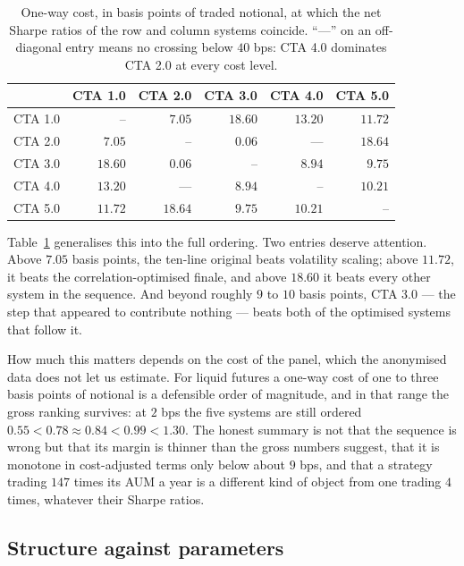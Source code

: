 \documentclass[11pt,a4paper]{article}
\begin{document}
\begin{table}[t]
\centering
\caption{One-way cost, in basis points of traded notional, at which the net
Sharpe ratios of the row and column systems coincide. ``---'' on an
off-diagonal entry means no crossing below $40$ bps: CTA 4.0 dominates
CTA 2.0 at every cost level.}
\label{tab:breakeven}
\begin{tabular}{lrrrrr}
\toprule
& CTA 1.0 & CTA 2.0 & CTA 3.0 & CTA 4.0 & CTA 5.0 \\
\midrule
CTA 1.0 & --      & $7.05$   & $18.60$ & $13.20$ & $11.72$ \\
CTA 2.0 & $7.05$  & --       & $0.06$  & ---     & $18.64$ \\
CTA 3.0 & $18.60$ & $0.06$   & --      & $8.94$  & $9.75$  \\
CTA 4.0 & $13.20$ & ---      & $8.94$  & --      & $10.21$ \\
CTA 5.0 & $11.72$ & $18.64$  & $9.75$  & $10.21$ & --      \\
\bottomrule
\end{tabular}
\end{table}

Table~\ref{tab:breakeven} generalises this into the full ordering. Two entries
deserve attention. Above $7.05$ basis points, the ten-line original beats
volatility scaling; above $11.72$, it beats the correlation-optimised finale,
and above $18.60$ it beats every other system in the sequence. And beyond
roughly $9$ to $10$ basis points, CTA 3.0 --- the step that appeared to
contribute nothing --- beats both of the optimised systems that follow it.

How much this matters depends on the cost of the panel, which the anonymised
data does not let us estimate. For liquid futures a one-way cost of one to
three basis points of notional is a defensible order of magnitude, and in that
range the gross ranking survives: at $2$ bps the five systems are still
ordered $0.55 < 0.78 \approx 0.84 < 0.99 < 1.30$. The honest summary is not
that the sequence is wrong but that its margin is thinner than the gross
numbers suggest, that it is monotone in cost-adjusted terms only below about
$9$ bps, and that a strategy trading $147$ times its AUM a year is a different
kind of object from one trading $4$ times, whatever their Sharpe ratios.

\subsection{Structure against parameters}
\end{document}
